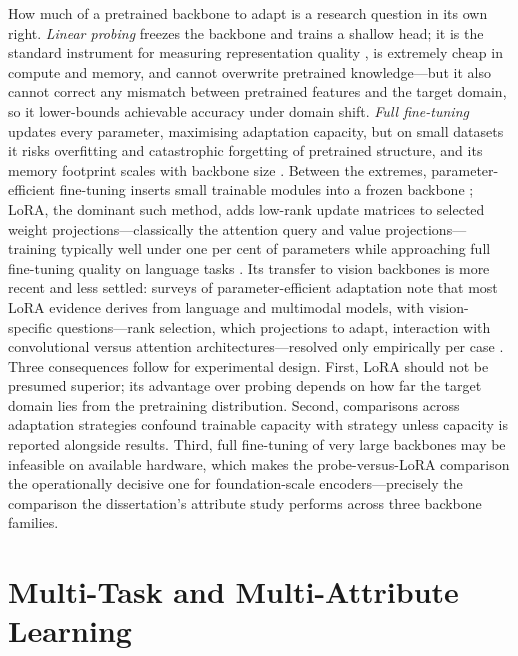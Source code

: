 How much of a pretrained backbone to adapt is a research question in its own right. \emph{Linear probing} freezes the backbone and trains a shallow head; it is the standard instrument for measuring representation quality \citep{chen2020simple,oquab2024dinov2}, is extremely cheap in compute and memory, and cannot overwrite pretrained knowledge---but it also cannot correct any mismatch between pretrained features and the target domain, so it lower-bounds achievable accuracy under domain shift. \emph{Full fine-tuning} updates every parameter, maximising adaptation capacity, but on small datasets it risks overfitting and catastrophic forgetting of pretrained structure, and its memory footprint scales with backbone size \citep{yosinski2014transferable,he2019rethinking}. Between the extremes, parameter-efficient fine-tuning inserts small trainable modules into a frozen backbone \citep{houlsby2019parameter}; LoRA, the dominant such method, adds low-rank update matrices to selected weight projections---classically the attention query and value projections---training typically well under one per cent of parameters while approaching full fine-tuning quality on language tasks \citep{hu2022lora}. Its transfer to vision backbones is more recent and less settled: surveys of parameter-efficient adaptation note that most LoRA evidence derives from language and multimodal models, with vision-specific questions---rank selection, which projections to adapt, interaction with convolutional versus attention architectures---resolved only empirically per case \citep{han2024parameter}. Three consequences follow for experimental design. First, LoRA should not be presumed superior; its advantage over probing depends on how far the target domain lies from the pretraining distribution. Second, comparisons across adaptation strategies confound trainable capacity with strategy unless capacity is reported alongside results. Third, full fine-tuning of very large backbones may be infeasible on available hardware, which makes the probe-versus-LoRA comparison the operationally decisive one for foundation-scale encoders---precisely the comparison the dissertation's attribute study performs across three backbone families.

\section{Multi-Task and Multi-Attribute Learning}
\label{sec:lr-multitask}

